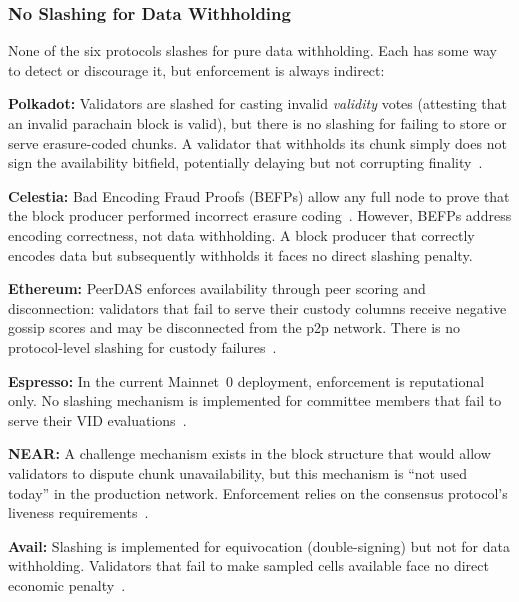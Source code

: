 \subsubsection{No Slashing for Data Withholding}

None of the six protocols slashes for pure data withholding.
Each has some way to detect or discourage it, but enforcement is always indirect:

\squishlist
\item \textbf{Polkadot:} Validators are slashed for casting invalid \emph{validity} votes (attesting that an invalid parachain block is valid), but there is no slashing for failing to store or serve erasure-coded chunks. A validator that withholds its chunk simply does not sign the availability bitfield, potentially delaying but not corrupting finality~\cite{Jeff_Burdges_ELVES}.

\item \textbf{Celestia:} Bad Encoding Fraud Proofs (BEFPs) allow any full node to prove that the block producer performed incorrect erasure coding~\cite{AlBassam_FraudDA}. However, BEFPs address encoding correctness, not data withholding. A block producer that correctly encodes data but subsequently withholds it faces no direct slashing penalty.

\item \textbf{Ethereum:} PeerDAS enforces availability through peer scoring and disconnection: validators that fail to serve their custody columns receive negative gossip scores and may be disconnected from the p2p network. There is no protocol-level slashing for custody failures~\cite{EIP-7594}.

\item \textbf{Espresso:} In the current Mainnet~0 deployment, enforcement is reputational only. No slashing mechanism is implemented for committee members that fail to serve their VID evaluations~\cite{Espresso:Hotshot_and_Triamisu}.

\item \textbf{NEAR:} A challenge mechanism exists in the block structure that would allow validators to dispute chunk unavailability, but this mechanism is ``not used today'' in the production network. Enforcement relies on the consensus protocol's liveness requirements~\cite{NEAR_Nightshade_Scaling_Blockchain}.

\item \textbf{Avail:} Slashing is implemented for equivocation (double-signing) but not for data withholding. Validators that fail to make sampled cells available face no direct economic penalty~\cite{Avail_The_DA_Blockchain}.
\squishend

